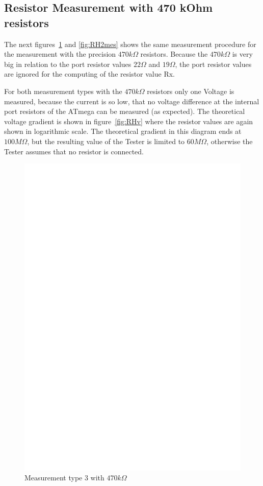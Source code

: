 \subsection{Resistor Measurement with 470 kOhm resistors}
The next figures~\ref{fig:RH1mes} and \ref{fig:RH2mes} shows the same measurement procedure for the
measurement with the precision \(470k\Omega\) resistors. Because the \(470k\Omega\) is very big in relation
to the port resistor values \(22\Omega\) and \(19\Omega\), the port resistor values are ignored for the computing
of the resistor value Rx.

For both measurement types with the \(470k\Omega\) resistors only one Voltage is measured, because the current
is so low, that no voltage difference at the internal port resistors of the ATmega can be measured (as expected).
The theoretical voltage gradient is shown in figure~\ref{fig:RHv} where the resistor values are again shown in logarithmic scale.
The theoretical gradient in this diagram ends at \(100M\Omega\), but the resulting value of the Tester is
limited to \(60M\Omega\), otherwise the Tester assumes that no resistor is connected.

\begin{figure}[H]
\centering
\includegraphics[]{../FIG/ResistormessH1.eps}
\caption{Measurement type 3 with \(470k\Omega\) }
\label{fig:RH1mes}
\end{figure}

